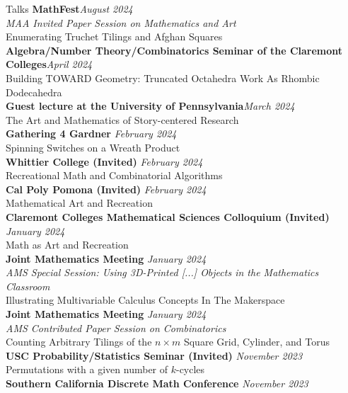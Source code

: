 \documentclass{cv} %
\begin{document}
\begin{rSection}{Talks}
  \textbf{MathFest}\hfill\textit{August 2024}
  \\ \textit{MAA Invited Paper Session on Mathematics and Art}
  \\ Enumerating Truchet Tilings and Afghan Squares
  \\
  \textbf{Algebra/Number Theory/Combinatorics Seminar of the Claremont Colleges}\hfill\textit{April 2024}
  \\ Building TOWARD Geometry: Truncated Octahedra Work As Rhombic Dodecahedra
  \\
  \textbf{Guest lecture at the University of Pennsylvania}\hfill\textit{March 2024}
  \\ The Art and Mathematics of Story-centered Research
  \\
  \textbf{Gathering 4 Gardner} \hfill \textit{February 2024}
  \\ Spinning Switches on a Wreath Product
  \\
  \textbf{Whittier College (Invited)} \hfill \textit{February 2024}
  \\ Recreational Math and Combinatorial Algorithms
  \\
  \textbf{Cal Poly Pomona (Invited)} \hfill \textit{February 2024}
  \\ Mathematical Art and Recreation
  \\
  \textbf{Claremont Colleges Mathematical Sciences Colloquium (Invited)} \hfill \textit{January 2024}
  \\ Math as Art and Recreation
  \\
  \textbf{Joint Mathematics Meeting} \hfill \textit{January 2024}
  \\ \textit{AMS Special Session: Using 3D-Printed [...] Objects in the Mathematics Classroom}
  \\ Illustrating Multivariable Calculus Concepts In The Makerspace
  \\
  \textbf{Joint Mathematics Meeting} \hfill \textit{January 2024} \\
  \textit{AMS Contributed Paper Session on Combinatorics} \\
  Counting Arbitrary Tilings of the $n \times m$ Square Grid, Cylinder, and Torus
  \\
  \textbf{USC Probability/Statistics Seminar (Invited)} \hfill \textit{November 2023} \\
  Permutations with a given number of $k$-cycles
  \\
  \textbf{Southern California Discrete Math Conference} \hfill \textit{November 2023} \\

\end{rSection}
\end{document}
